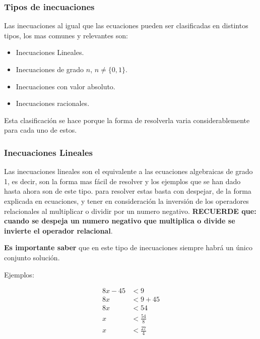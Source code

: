 \documentclass[12pt]{article}
\begin{document}
    \subsubsection{Tipos de inecuaciones} \label{Tipos-de-inecuaciones}

    Las inecuaciones al igual que las ecuaciones pueden ser clasificadas en
    distintos tipos, los mas comunes y relevantes son:

    \begin{itemize}
        \item Inecuaciones Lineales.
        \item Inecuaciones de grado $n$, $n \not = \{0,1\}$.
        \item Inecuaciones con valor absoluto.
        \item Inecuaciones racionales.
    \end{itemize}

    Esta clasificación se hace porque la forma de resolverla varia
    considerablemente para cada uno de estos.

    \subsubsection*{Inecuaciones Lineales} \label{Inecuaciones-Lineales}

    Las inecuaciones lineales son el equivalente a las ecuaciones algebraicas
    de grado 1, es decir, son la forma mas fácil de resolver y los ejemplos que
    se han dado hasta ahora son de este tipo. para resolver
    estas basta con despejar, de la forma explicada en \refname{ecuaciones},
    y tener en consideración la inversión de los operadores relacionales al
    multiplicar o dividir por un numero negativo. \textbf{RECUERDE que:}
    \textbf{cuando se despeja un numero negativo que multiplica
    o divide se invierte el operador relacional}.

    \textbf{Es importante saber } que en este tipo de inecuaciones siempre habrá
    un único conjunto solución.

    Ejemplos:

    \begin{align*}
        8x -45  &<9 		\\
        8x &< 9+45 \\
        8x & < 54\\
        x & < \frac{54}{8} \\
        x & < \frac{27}{4}
    \end{align*}
\end{document}
